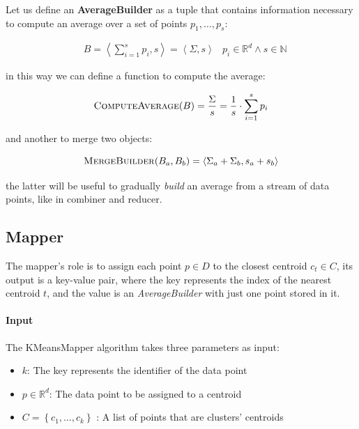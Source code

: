 \documentclass[parskip=full]{report}
\begin{document}
Let us define an \textbf{AverageBuilder} as a tuple that contains information 
necessary to compute an average over a set of points ${p_1, \dots, p_s}$:

\begin{align}
	\label{def:avgBuild}
& B = \left\langle \sum_{i = 1}^{s} p_i, s\right\rangle =
\left\langle \Sigma, s\right\rangle
&
p_i \in \mathbb{R}^d \land s \in \mathbb{N}
\end{align}

in this way we can define a function to compute the average:

\begin{equation}
\label{computeAvg}
\text{\textsc{ComputeAverage}}(B) = \dfrac{\Sigma}{s}
= \dfrac{1}{s}\cdot\sum_{i = 1}^{s} p_i
\end{equation}

and another to merge two objects:

\begin{equation}
\label{mergeAvg}
\text{\textsc{MergeBuilder}}(B_a, B_b) =
\left\langle \Sigma_a + \Sigma_b, s_a + s_b\right\rangle
\end{equation}

the latter will be useful to gradually \textit{build} an average from a stream 
of 
data points, like in combiner and reducer.

\subsection{Mapper}
The mapper's role is to assign each point $p \in D$ to the closest centroid 
$c_t \in C$, its output is a key-value pair, where the key represents the 
index of the nearest centroid $t$, and the value is an \emph{AverageBuilder} 
with just one point stored in it.

\paragraph{Input}
The KMeansMapper algorithm takes three parameters as input:

\begin{itemize}
	\item $k$: The key represents the identifier of the data point
	\item $p \in \mathbb{R}^d$: The data point to be assigned to a centroid
	\item $C = \left\{c_1, \dots, c_k\right\}$ : A list of points that are 
	clusters' centroids
\end{itemize}
\end{document}
